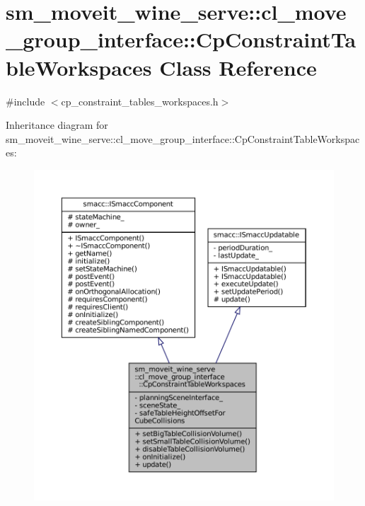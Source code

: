 \hypertarget{classsm__moveit__wine__serve_1_1cl__move__group__interface_1_1CpConstraintTableWorkspaces}{}\section{sm\+\_\+moveit\+\_\+wine\+\_\+serve\+:\+:cl\+\_\+move\+\_\+group\+\_\+interface\+:\+:Cp\+Constraint\+Table\+Workspaces Class Reference}
\label{classsm__moveit__wine__serve_1_1cl__move__group__interface_1_1CpConstraintTableWorkspaces}


{\ttfamily \#include $<$cp\+\_\+constraint\+\_\+tables\+\_\+workspaces.\+h$>$}



Inheritance diagram for sm\+\_\+moveit\+\_\+wine\+\_\+serve\+:\+:cl\+\_\+move\+\_\+group\+\_\+interface\+:\+:Cp\+Constraint\+Table\+Workspaces\+:
\nopagebreak
\begin{figure}[H]
\begin{center}
\leavevmode
\includegraphics[width=350pt]{classsm__moveit__wine__serve_1_1cl__move__group__interface_1_1CpConstraintTableWorkspaces__inherit__graph}
\end{center}
\end{figure}


